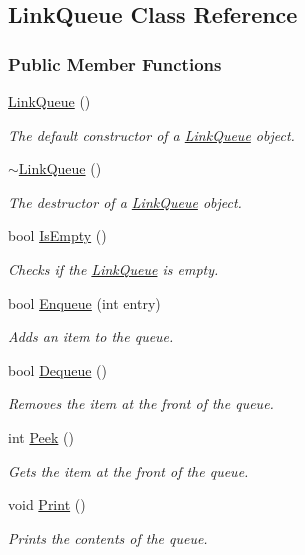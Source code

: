 \hypertarget{class_link_queue}{}\subsection{Link\+Queue Class Reference}
\label{class_link_queue}
\subsubsection*{Public Member Functions}
\begin{DoxyCompactItemize}
\item 
\hyperlink{class_link_queue_acbed59f09a70e4a5e866cb38ce1d5d3d}{Link\+Queue} ()
\begin{DoxyCompactList}\small\item\em The default constructor of a \hyperlink{class_link_queue}{Link\+Queue} object. \end{DoxyCompactList}\item 
\hyperlink{class_link_queue_a7c4b68878df5977099456c3c53b007cc}{$\sim$\+Link\+Queue} ()
\begin{DoxyCompactList}\small\item\em The destructor of a \hyperlink{class_link_queue}{Link\+Queue} object. \end{DoxyCompactList}\item 
bool \hyperlink{class_link_queue_a5f7248f81dfae6c2473147e018b7f301}{Is\+Empty} ()
\begin{DoxyCompactList}\small\item\em Checks if the \hyperlink{class_link_queue}{Link\+Queue} is empty. \end{DoxyCompactList}\item 
bool \hyperlink{class_link_queue_a183e5be71694f35fc2012ba3c759d7bc}{Enqueue} (int entry)
\begin{DoxyCompactList}\small\item\em Adds an item to the queue. \end{DoxyCompactList}\item 
bool \hyperlink{class_link_queue_a50f1cce3d6eb4c4f4fb517119c152534}{Dequeue} ()
\begin{DoxyCompactList}\small\item\em Removes the item at the front of the queue. \end{DoxyCompactList}\item 
int \hyperlink{class_link_queue_aebf3869745a9c750d23d5265012485ad}{Peek} ()
\begin{DoxyCompactList}\small\item\em Gets the item at the front of the queue. \end{DoxyCompactList}\item 
void \hyperlink{class_link_queue_a616b8529cea87ca65c89b78f52376992}{Print} ()
\begin{DoxyCompactList}\small\item\em Prints the contents of the queue. \end{DoxyCompactList}\end{DoxyCompactItemize}
